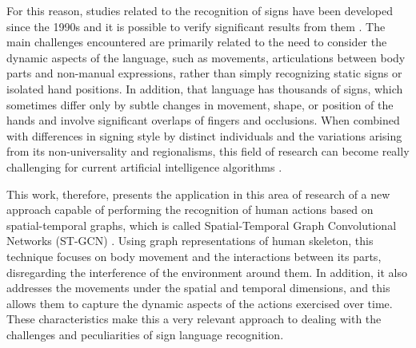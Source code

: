 
For this reason, studies related to the recognition of signs have been developed since the 1990s and it is possible to verify significant results from them \cite{lim-2016, recent-advances-dl-2017}. The main challenges encountered are primarily related to the need to consider the dynamic aspects of the language, such as movements, articulations between body parts and non-manual expressions, rather than simply recognizing static signs or isolated hand positions. In addition, that language has thousands of signs, which sometimes differ only by subtle changes in movement, shape, or position of the hands and involve significant overlaps of fingers and occlusions. When combined with differences in signing style by distinct individuals and the variations arising from its non-universality and regionalisms, this field of research can become really challenging for current artificial intelligence algorithms \cite{konstantinidis-2018}.

 
This work, therefore, presents the application in this area of research of a new approach capable of performing the recognition of human actions based on spatial-temporal graphs, which is called Spatial-Temporal Graph Convolutional Networks (ST-GCN) \cite {st-gcn-2018}. Using graph representations of human skeleton, this technique focuses on body movement and the interactions between its parts, disregarding the interference of the environment around them. In addition, it also addresses the movements under the spatial and temporal dimensions, and this allows them to capture the dynamic aspects of the actions exercised over time. These characteristics make this a very relevant approach to dealing with the challenges and peculiarities of sign language recognition.

